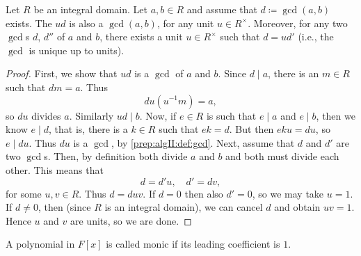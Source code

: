 \documentclass[10pt, a4paper]{article}
\begin{document}
\begin{lemma}
    Let $R$ be an integral domain.
    Let $a, b \in R$ and assume that $d \coloneqq \gcd(a, b)$ exists.
    The $ud$ is also a $\gcd(a, b)$,
    for any unit $u \in R ^ {\times}$.
    Moreover,
    for any two $\gcd$s $d$,
    $d''$ of $a$ and $b$,
    there exists a unit $u \in R ^ {\times}$ such that $d = ud'$
    (i.e.,
    the $\gcd$ is unique up to units).

    \begin{proof}
        First,
        we show that $ud$ is a $\gcd$ of $a$ and $b$.
        Since $d \mid a$,
        there is an $m \in R$ such that $dm = a$.
        Thus
        \[
        du(u ^ {-1}m) = a,
        \]
        so $du$ divides $a$.
        Similarly $ud \mid b$.
        Now,
        if $e \in R$ is such that $e \mid a$ and $e \mid b$,
        then we know $e \mid d$,
        that is,
        there is a $k \in R$ such that $ek = d$.
        But then $eku = du$,
        so $e \mid du$.
        Thus $du$ is a $\gcd$,
        by \autoref{prep:algII:def:gcd}.
        Next,
        assume that $d$ and $d'$ are two $\gcd$s.
        Then,
        by definition both divide $a$ and $b$ and both must divide each other.
        This means that
        \[
        d = d'u,\quad d' = dv,
        \]
        for some $u, v \in R$.
        Thus $d = duv$.
        If $d = 0$ then also $d' = 0$,
        so we may take $u = 1$.
        If $d \neq 0$,
        then
        (since $R$ is an integral domain),
        we can cancel $d$ and obtain $uv = 1$.
        Hence $u$ and $v$ are units,
        so we are done.
    \end{proof}
\end{lemma}

A polynomial in $F[x]$ is called monic if its leading coefficient is $1$.
\end{document}

